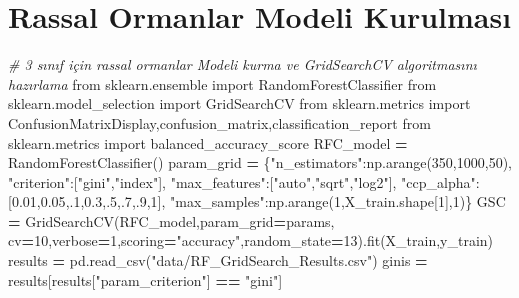 \documentclass[12pt,twoside]{deuthesis}
\newenvironment{Shaded}{\begin{snugshade}}{\end{snugshade}}
\newcommand{\CommentTok}[1]{\textcolor[rgb]{0.56,0.35,0.01}{\textit{#1}}}
\newcommand{\DecValTok}[1]{\textcolor[rgb]{0.00,0.00,0.81}{#1}}
\newcommand{\FloatTok}[1]{\textcolor[rgb]{0.00,0.00,0.81}{#1}}
\newcommand{\ImportTok}[1]{#1}
\newcommand{\NormalTok}[1]{#1}
\newcommand{\OperatorTok}[1]{\textcolor[rgb]{0.81,0.36,0.00}{\textbf{#1}}}
\newcommand{\StringTok}[1]{\textcolor[rgb]{0.31,0.60,0.02}{#1}}
\begin{document}
\hypertarget{rassal-ormanlar-modeli-kurulmasux131}{%
\section{Rassal Ormanlar Modeli Kurulması}\label{rassal-ormanlar-modeli-kurulmasux131}}

\scriptsize
\begin{Shaded}
\begin{Highlighting}[]
\CommentTok{\# 3 sınıf için rassal ormanlar Modeli kurma ve GridSearchCV algoritmasını hazırlama}
\ImportTok{from}\NormalTok{ sklearn.ensemble }\ImportTok{import}\NormalTok{ RandomForestClassifier}
\ImportTok{from}\NormalTok{ sklearn.model\_selection }\ImportTok{import}\NormalTok{ GridSearchCV}
\ImportTok{from}\NormalTok{ sklearn.metrics }\ImportTok{import}\NormalTok{ ConfusionMatrixDisplay,confusion\_matrix,classification\_report}
\ImportTok{from}\NormalTok{ sklearn.metrics }\ImportTok{import}\NormalTok{ balanced\_accuracy\_score}
\NormalTok{RFC\_model }\OperatorTok{=}\NormalTok{ RandomForestClassifier()}
\NormalTok{param\_grid }\OperatorTok{=}\NormalTok{ \{}\StringTok{"n\_estimators"}\NormalTok{:np.arange(}\DecValTok{350}\NormalTok{,}\DecValTok{1000}\NormalTok{,}\DecValTok{50}\NormalTok{),}
              \StringTok{"criterion"}\NormalTok{:[}\StringTok{"gini"}\NormalTok{,}\StringTok{"index"}\NormalTok{],}
              \StringTok{"max\_features"}\NormalTok{:[}\StringTok{"auto"}\NormalTok{,}\StringTok{"sqrt"}\NormalTok{,}\StringTok{"log2"}\NormalTok{],}
              \StringTok{"ccp\_alpha"}\NormalTok{:[}\FloatTok{0.01}\NormalTok{,}\FloatTok{0.05}\NormalTok{,}\FloatTok{.1}\NormalTok{,}\FloatTok{0.3}\NormalTok{,}\FloatTok{.5}\NormalTok{,}\FloatTok{.7}\NormalTok{,}\FloatTok{.9}\NormalTok{,}\DecValTok{1}\NormalTok{],}
              \StringTok{"max\_samples"}\NormalTok{:np.arange(}\DecValTok{1}\NormalTok{,X\_train.shape[}\DecValTok{1}\NormalTok{],}\DecValTok{1}\NormalTok{)\}}
\NormalTok{GSC }\OperatorTok{=}\NormalTok{ GridSearchCV(RFC\_model,param\_grid}\OperatorTok{=}\NormalTok{params,}
\NormalTok{                   cv}\OperatorTok{=}\DecValTok{10}\NormalTok{,verbose}\OperatorTok{=}\DecValTok{1}\NormalTok{,scoring}\OperatorTok{=}\StringTok{"accuracy"}\NormalTok{,random\_state}\OperatorTok{=}\DecValTok{13}\NormalTok{).fit(X\_train,y\_train)}
\NormalTok{results }\OperatorTok{=}\NormalTok{ pd.read\_csv(}\StringTok{"data/RF\_GridSearch\_Results.csv"}\NormalTok{)}
\NormalTok{ginis }\OperatorTok{=}\NormalTok{ results[results[}\StringTok{"param\_criterion"}\NormalTok{] }\OperatorTok{==} \StringTok{"gini"}\NormalTok{]}

\end{Highlighting}
\end{Shaded}
\end{document}
